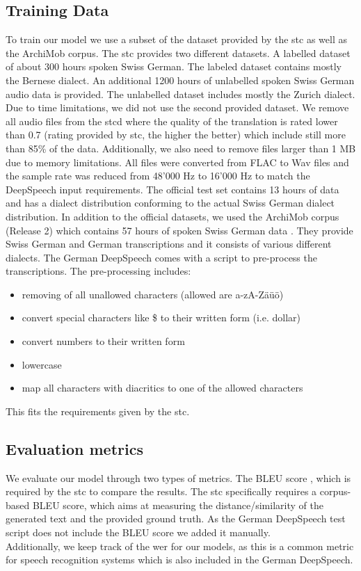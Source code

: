 \subsection{Training Data}
To train our model we use a subset of the dataset provided by the \gls{stc} as well as the ArchiMob corpus. The \gls{stc} provides two different datasets. A labelled dataset of about 300 hours spoken Swiss German. The labeled dataset contains mostly the Bernese dialect. An additional 1200 hours of unlabelled spoken Swiss German audio data is provided. The unlabelled dataset includes mostly the Zurich dialect. Due to time limitations, we did not use the second provided dataset. We remove all audio files from the \gls{stcd} where the quality of the translation is rated lower than 0.7 (rating provided by \gls{stc}, the higher the better) which include still more than 85\% of the data. Additionally, we also need to remove files larger than 1 MB due to memory limitations. All files were converted from FLAC to Wav files and the sample rate was reduced from 48'000 Hz to 16'000 Hz to match the DeepSpeech input requirements. The official test set contains 13 hours of data \cite{stc2019} and has a dialect distribution conforming to the actual Swiss German dialect distribution. In addition to the official datasets, we used the ArchiMob corpus (Release 2) which contains 57 hours of spoken Swiss German data \cite{archimob2016}. They provide Swiss German and German transcriptions and it consists of various different dialects.
The German DeepSpeech comes with a script to pre-process the transcriptions. The pre-processing includes:
\begin{itemize}
\item removing of all unallowed characters (allowed are a-zA-Zäüö)
\item convert special characters like \$ to their written form (i.e. dollar)
\item convert numbers to their written form
\item lowercase
\item map all characters with diacritics to one of the allowed characters
\end{itemize}

This fits the requirements given by the \gls{stc}.

\subsection{Evaluation metrics}
We evaluate our model through two types of metrics. The BLEU score \cite{Papineni2002BleuAM}, which is required by the \gls{stc} to compare the results. The \gls{stc} specifically requires a corpus-based BLEU score, which aims at measuring the distance/similarity of the generated text and the provided ground truth. As the German DeepSpeech test script does not include the BLEU score we added it manually. \\ Additionally, we keep track of the \gls{wer} for our models, as
this is a common metric for speech recognition systems \cite{Park2008AnEA} which is also included in the German DeepSpeech.

